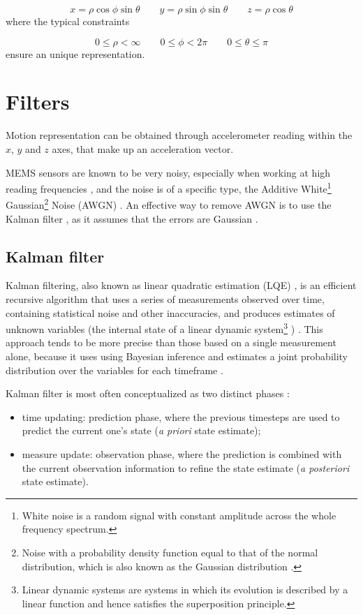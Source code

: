 \[
	x = \rho \cos\phi \sin\theta \quad\quad y = \rho \sin\phi \sin\theta \quad\quad  z = \rho \cos\theta
\]
where the typical constraints

\[
	0 \leq \rho < \infty \quad\quad 0 \leq \phi < 2\pi \quad\quad 0 \leq \theta \leq \pi
\]
ensure an unique representation.

\section{Filters}
Motion representation can be obtained through accelerometer reading within the $x$, $y$ and $z$ axes, that make up an acceleration vector.

MEMS sensors are known to be very noisy, especially when working at high reading frequencies \cite[7]{Mat08}, and the noise is of a specific type, the Additive White\footnote{White noise is a random signal with constant amplitude across the whole frequency spectrum.} Gaussian\footnote{Noise with a probability density function equal to that of the normal distribution, which is also known as the Gaussian distribution \cite{WikipediaGaussianNoise}.} Noise (AWGN) \cite{Yas03}. An effective way to remove AWGN is to use the Kalman filter \cite{Ko07, Sär15}, as it assumes that the errors are Gaussian \cite{Kal60}.

\subsection{Kalman filter}
Kalman filtering, also known as linear quadratic estimation (LQE) \cite{Ma19}, is an efficient recursive algorithm that uses a series of measurements observed over time, containing statistical noise and other inaccuracies, and produces estimates of unknown variables (the internal state of a linear dynamic system\footnote{Linear dynamic systems are systems in which its evolution is described by a linear function and hence satisfies the superposition principle.} \cite[47]{Ma19}) \cite[7-8]{Ma19}. This approach tends to be more precise than those based on a single measurement alone, because it uses using Bayesian inference and estimates a joint probability distribution over the variables for each timeframe \cite[8]{Ma19}.

Kalman filter is most often conceptualized as two distinct phases \cite[12-13]{Ma19}:

\begin{itemize}
	\item time updating: prediction phase, where the previous timesteps are used to predict the current one's state (\textit{a priori} state estimate);
	\item measure update: observation phase, where the prediction is combined with the current observation information to refine the state estimate (\textit{a posteriori} state estimate).
\end{itemize}

